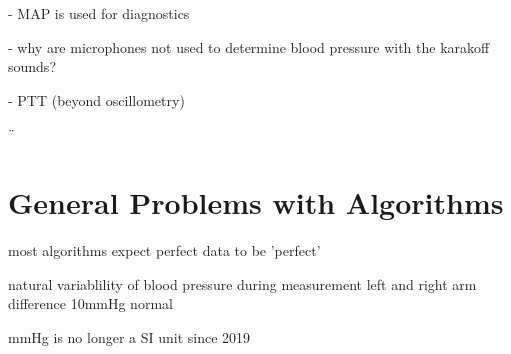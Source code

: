 - MAP is used for diagnostics

- why are microphones not used to determine blood pressure with the karakoff sounds?

- PTT (beyond oscillometry)

¨
\
\section{General Problems with Algorithms}
most algorithms expect perfect data to be 'perfect'

natural variablility of blood pressure during measurement
left and right arm difference 10mmHg normal


mmHg is no longer a SI unit since 2019
